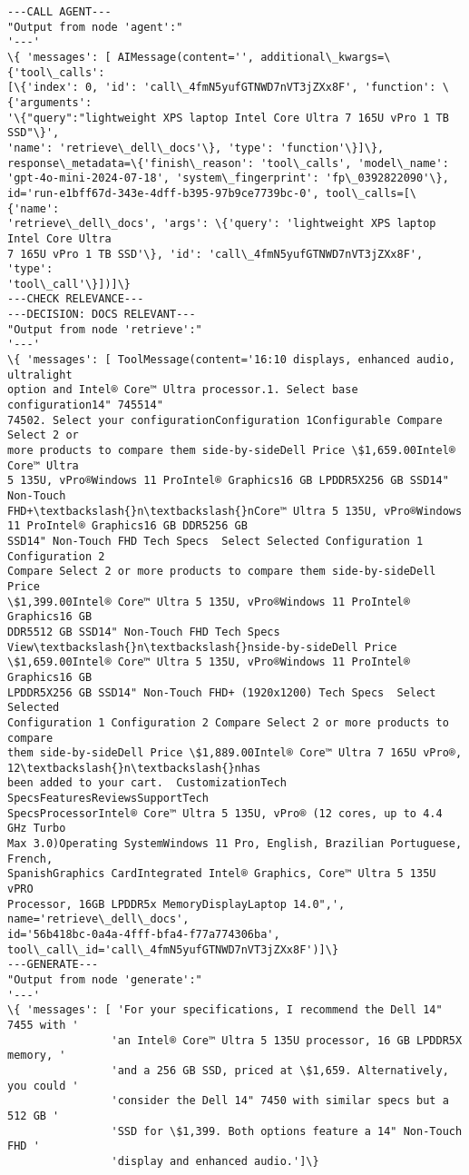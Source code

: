 \documentclass[11pt]{article}
\begin{document}
    \begin{Verbatim}[commandchars=\\\{\}]
---CALL AGENT---
"Output from node 'agent':"
'---'
\{ 'messages': [ AIMessage(content='', additional\_kwargs=\{'tool\_calls':
[\{'index': 0, 'id': 'call\_4fmN5yufGTNWD7nVT3jZXx8F', 'function': \{'arguments':
'\{"query":"lightweight XPS laptop Intel Core Ultra 7 165U vPro 1 TB SSD"\}',
'name': 'retrieve\_dell\_docs'\}, 'type': 'function'\}]\},
response\_metadata=\{'finish\_reason': 'tool\_calls', 'model\_name':
'gpt-4o-mini-2024-07-18', 'system\_fingerprint': 'fp\_0392822090'\},
id='run-e1bff67d-343e-4dff-b395-97b9ce7739bc-0', tool\_calls=[\{'name':
'retrieve\_dell\_docs', 'args': \{'query': 'lightweight XPS laptop Intel Core Ultra
7 165U vPro 1 TB SSD'\}, 'id': 'call\_4fmN5yufGTNWD7nVT3jZXx8F', 'type':
'tool\_call'\}])]\}
---CHECK RELEVANCE---
---DECISION: DOCS RELEVANT---
"Output from node 'retrieve':"
'---'
\{ 'messages': [ ToolMessage(content='16:10 displays, enhanced audio, ultralight
option and Intel® Core™ Ultra processor.1. Select base configuration14" 745514"
74502. Select your configurationConfiguration 1Configurable Compare Select 2 or
more products to compare them side-by-sideDell Price \$1,659.00Intel® Core™ Ultra
5 135U, vPro®Windows 11 ProIntel® Graphics16 GB LPDDR5X256 GB SSD14" Non-Touch
FHD+\textbackslash{}n\textbackslash{}nCore™ Ultra 5 135U, vPro®Windows 11 ProIntel® Graphics16 GB DDR5256 GB
SSD14" Non-Touch FHD Tech Specs  Select Selected Configuration 1 Configuration 2
Compare Select 2 or more products to compare them side-by-sideDell Price
\$1,399.00Intel® Core™ Ultra 5 135U, vPro®Windows 11 ProIntel® Graphics16 GB
DDR5512 GB SSD14" Non-Touch FHD Tech Specs  View\textbackslash{}n\textbackslash{}nside-by-sideDell Price
\$1,659.00Intel® Core™ Ultra 5 135U, vPro®Windows 11 ProIntel® Graphics16 GB
LPDDR5X256 GB SSD14" Non-Touch FHD+ (1920x1200) Tech Specs  Select Selected
Configuration 1 Configuration 2 Compare Select 2 or more products to compare
them side-by-sideDell Price \$1,889.00Intel® Core™ Ultra 7 165U vPro®, 12\textbackslash{}n\textbackslash{}nhas
been added to your cart.  CustomizationTech SpecsFeaturesReviewsSupportTech
SpecsProcessorIntel® Core™ Ultra 5 135U, vPro® (12 cores, up to 4.4 GHz Turbo
Max 3.0)Operating SystemWindows 11 Pro, English, Brazilian Portuguese, French,
SpanishGraphics CardIntegrated Intel® Graphics, Core™ Ultra 5 135U vPRO
Processor, 16GB LPDDR5x MemoryDisplayLaptop 14.0",', name='retrieve\_dell\_docs',
id='56b418bc-0a4a-4fff-bfa4-f77a774306ba',
tool\_call\_id='call\_4fmN5yufGTNWD7nVT3jZXx8F')]\}
---GENERATE---
"Output from node 'generate':"
'---'
\{ 'messages': [ 'For your specifications, I recommend the Dell 14" 7455 with '
                'an Intel® Core™ Ultra 5 135U processor, 16 GB LPDDR5X memory, '
                'and a 256 GB SSD, priced at \$1,659. Alternatively, you could '
                'consider the Dell 14" 7450 with similar specs but a 512 GB '
                'SSD for \$1,399. Both options feature a 14" Non-Touch FHD '
                'display and enhanced audio.']\}
    \end{Verbatim}
\end{document}
